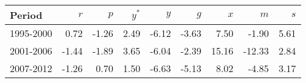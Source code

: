 
\begin{tabular}{lrrrrrrrr}
\toprule
Period & $r$ & $p$ & $y^{*}$ & $y$ & $g$ & $x$ & $m$ & $s$\\
\midrule
1995-2000 & 0.72 & -1.26 & 2.49 & -6.12 & -3.63 & 7.50 & -1.90 & 5.61\\
2001-2006 & -1.44 & -1.89 & 3.65 & -6.04 & -2.39 & 15.16 & -12.33 & 2.84\\
2007-2012 & -1.26 & 0.70 & 1.50 & -6.63 & -5.13 & 8.02 & -4.85 & 3.17\\
\bottomrule
\end{tabular}
